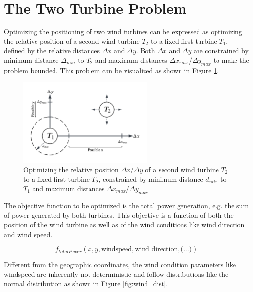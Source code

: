 \documentclass[preprint,12pt]{elsarticle}
\begin{document}
\section{The Two Turbine Problem}

Optimizing the positioning of two wind turbines can be expressed as optimizing the relative position of a second wind turbine $T_2$ to a fixed first turbine $T_1$, defined by the relative distances $\Delta x$ and  $\Delta y$. Both  $\Delta x$ and  $\Delta y$ are constrained by minimum distance $\Delta_{min}$ to  $T_2$ and maximum distances $\Delta x_{max}$/$\Delta y_{max}$ to make the problem bounded. 
This problem can be visualized as shown in Figure \ref{fig:two_turbine_problem}.

\begin{figure}[h] 
	\centering
	\includegraphics[width=0.6\textwidth]{../figures/optimization/two_turbine_problem_schematic.png} %
	\caption{Optimizing the relative position $\Delta x$/$\Delta y$ of a second wind turbine $T_2$ to a fixed first turbine $T_2$, constrained by minimum distance $d_{min}$ to  $T_1$ and maximum distances $\Delta x_{max}$/$\Delta y_{max}$}
	\label{fig:two_turbine_problem}
\end{figure}

The objective function to be optimized is the total power generation, e.g. the sum of power generated by both turbines. This objective is a function of both the position of the wind turbine as well as of the wind conditions like wind direction and wind speed. 

$$
f_{total Power}(x,y,\text{windspeed},\text{wind direction}, \text{(...)})
$$

Different from the geographic coordinates, the wind condition parameters like windspeed are inherently not deterministic and follow distributions like the normal distribution as shown in Figure \ref{fig:wind_dist}.
\end{document}
